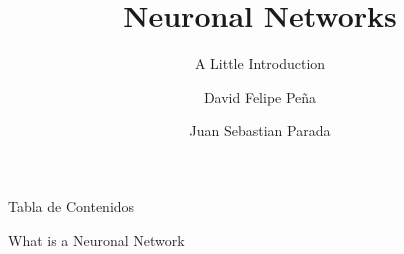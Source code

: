 \documentclass{beamer}
\title{Neuronal Networks}
\subtitle{A Little Introduction}
\author{David Felipe Peña \and Juan Sebastian Parada}
\begin{document}
	\frame{\maketitle}
	\AtBeginSection[]{}
	\begin{frame}{Tabla de Contenidos}
		\tableofcontents
	\end{frame}
	\begin{frame}{What is a Neuronal Network}
	\end{frame}
\end{document}
